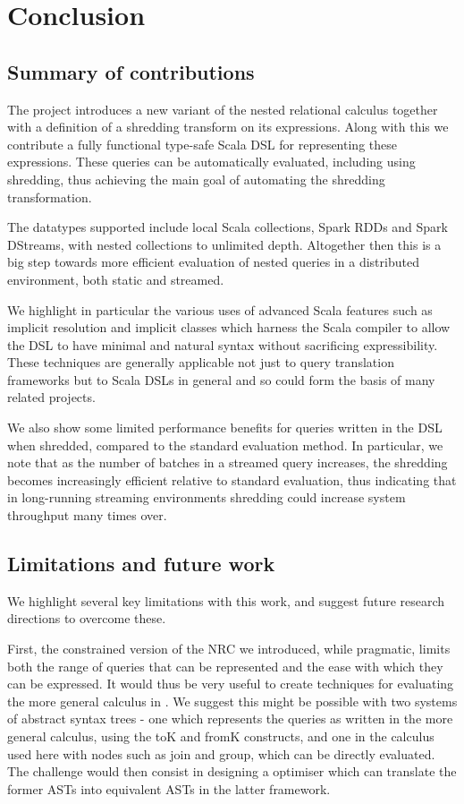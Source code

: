 \chapter{Conclusion} \label{conclusion}

\section{Summary of contributions}

The project introduces a new variant of the nested relational calculus together with a definition of a shredding transform on its expressions. Along with this we contribute a fully functional type-safe Scala DSL for representing these expressions. These queries can be automatically evaluated, including using shredding, thus achieving the main goal of automating the shredding transformation.

The datatypes supported include local Scala collections, Spark RDDs and Spark DStreams, with nested collections to unlimited depth. Altogether then this is a big step towards more efficient evaluation of nested queries in a distributed environment, both static and streamed.

We highlight in particular the various uses of advanced Scala features such as implicit resolution and implicit classes which harness the Scala compiler to allow the DSL to have minimal and natural syntax without sacrificing expressibility. These techniques are generally applicable not just to query translation frameworks but to Scala DSLs in general and so could form the basis of many related projects.

We also show some limited performance benefits for queries written in the DSL when shredded, compared to the standard evaluation method. In particular, we note that as the number of batches in a streamed query increases, the shredding becomes increasingly efficient relative to standard evaluation, thus indicating that in long-running streaming environments shredding could increase system throughput many times over.

\section{Limitations and future work}

We highlight several key limitations with this work, and suggest future research directions to overcome these.

First, the constrained version of the NRC we introduced, while pragmatic, limits both the range of queries that can be represented and the ease with which they can be expressed.  It would thus be very useful to create techniques for evaluating the more general calculus in \cite{draftpaper}. We suggest this might be possible with two systems of abstract syntax trees - one which represents the queries as written in the more general calculus, using the toK and fromK constructs, and one in the calculus used here with nodes such as join and group, which can be directly evaluated. The challenge would then consist in designing a optimiser which can translate the former ASTs into equivalent ASTs in the latter framework.

